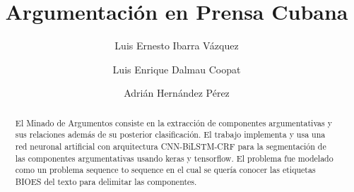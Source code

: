 \documentclass[runningheads]{llncs}
\begin{document}
%
\title{Argumentación en Prensa Cubana}
%
%
\author{Luis Ernesto Ibarra Vázquez \and
Luis Enrique Dalmau Coopat \and 
Adrián Hernández Pérez}
%
%
%
\maketitle              %
%
\begin{abstract}

El Minado de Argumentos consiste en la extracción de componentes argumentativas 
y sus relaciones además de su posterior clasificación. El trabajo implementa 
y usa una red neuronal artificial con arquitectura CNN-BiLSTM-CRF para la
segmentación de las componentes argumentativas usando keras y tensorflow. 
El problema fue modelado como un problema sequence to sequence en el cual se quería conocer las
etiquetas BIOES del texto para delimitar las componentes.

	
\end{abstract}
%
%
%
%
%
%
\end{document}
